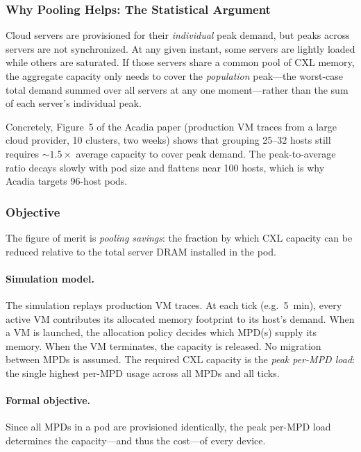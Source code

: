 \documentclass[11pt]{article}
\begin{document}
\subsubsection*{Why Pooling Helps: The Statistical Argument}

Cloud servers are provisioned for their \emph{individual} peak demand, but
peaks across servers are not synchronized.  At any given instant, some servers
are lightly loaded while others are saturated.  If those servers share a common
pool of CXL memory, the aggregate capacity only needs to cover the
\emph{population} peak---the worst-case total demand summed over all servers at
any one moment---rather than the sum of each server's individual peak.

Concretely, Figure~5 of the Acadia paper (production VM traces from a large
cloud provider, 10 clusters, two weeks) shows that grouping 25--32 hosts still
requires $\sim 1.5\times$ average capacity to cover peak demand.  The
peak-to-average ratio decays slowly with pod size and flattens near 100 hosts,
which is why Acadia targets 96-host pods.

\subsubsection*{Objective}

The figure of merit is \emph{pooling savings}: the fraction by which CXL
capacity can be reduced relative to the total server DRAM installed in the pod.

\paragraph{Simulation model.}
The simulation replays production VM traces.  At each tick (e.g.~5~min), every
active VM contributes its allocated memory footprint to its host's demand.  When
a VM is launched, the allocation policy decides which MPD(s) supply its memory.
When the VM terminates, the capacity is released.  No migration between MPDs
is assumed.  The required CXL capacity is the \emph{peak per-MPD load}: the
single highest per-MPD usage across all MPDs and all ticks.

\paragraph{Formal objective.}
Since all MPDs in a pod are provisioned identically, the peak per-MPD load
determines the capacity---and thus the cost---of every device.
\end{document}
